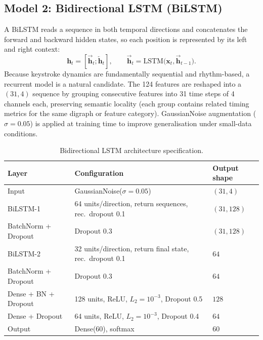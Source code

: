 \subsection{Model 2: Bidirectional LSTM (BiLSTM)}
A BiLSTM reads a sequence in both temporal directions and concatenates the forward and backward hidden states, so each position is represented by its left and right context:
\begin{equation}
\mathbf{h}_t=\left[\overrightarrow{\mathbf{h}}_t;\overleftarrow{\mathbf{h}}_t\right],\qquad
\overrightarrow{\mathbf{h}}_t=\mathrm{LSTM}\big(\mathbf{x}_t,\overrightarrow{\mathbf{h}}_{t-1}\big).
\end{equation}
Because keystroke dynamics are fundamentally sequential and rhythm-based, a recurrent model is a natural candidate. The 124 features are reshaped into a $(31,4)$ sequence by grouping consecutive features into 31 time steps of 4 channels each, preserving semantic locality (each group contains related timing metrics for the same digraph or feature category). GaussianNoise augmentation ($\sigma=0.05$) is applied at training time to improve generalisation under small-data conditions.

\begin{table}[H]
\centering
\caption{Bidirectional LSTM architecture specification.}
\begin{tabular}{@{}lll@{}}
\toprule
\textbf{Layer} & \textbf{Configuration} & \textbf{Output shape} \\ \midrule
Input & GaussianNoise($\sigma=0.05$) & $(31,4)$ \\
BiLSTM-1 & 64 units/direction, return sequences, rec.\ dropout 0.1 & $(31,128)$ \\
BatchNorm + Dropout & Dropout 0.3 & $(31,128)$ \\
BiLSTM-2 & 32 units/direction, return final state, rec.\ dropout 0.1 & $64$ \\
BatchNorm + Dropout & Dropout 0.3 & $64$ \\
Dense + BN + Dropout & 128 units, ReLU, $L_2=10^{-3}$, Dropout 0.5 & $128$ \\
Dense + Dropout & 64 units, ReLU, $L_2=10^{-3}$, Dropout 0.4 & $64$ \\
Output & Dense(60), softmax & $60$ \\ \bottomrule
\end{tabular}
\end{table}

